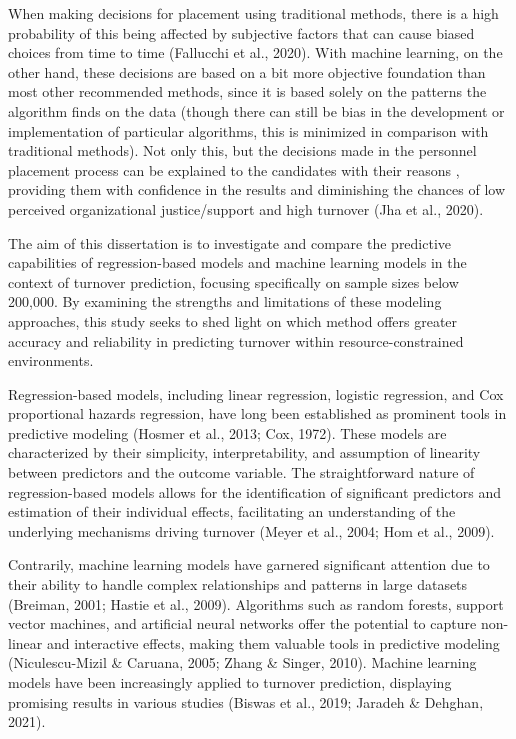 \documentclass[
  man]{apa6}
\begin{document}
When making decisions for placement using traditional methods, there is a high probability of this being affected by subjective factors that can cause biased choices from time to time (Fallucchi et al., 2020). With machine learning, on the other hand, these decisions are based on a bit more objective foundation than most other recommended methods, since it is based solely on the patterns the algorithm finds on the data (though there can still be bias in the development or implementation of particular algorithms, this is minimized in comparison with traditional methods). Not only this, but the decisions made in the personnel placement process can be explained to the candidates with their reasons , providing them with confidence in the results and diminishing the chances of low perceived organizational justice/support and high turnover (Jha et al., 2020).

The aim of this dissertation is to investigate and compare the predictive capabilities of regression-based models and machine learning models in the context of turnover prediction, focusing specifically on sample sizes below 200,000. By examining the strengths and limitations of these modeling approaches, this study seeks to shed light on which method offers greater accuracy and reliability in predicting turnover within resource-constrained environments.

Regression-based models, including linear regression, logistic regression, and Cox proportional hazards regression, have long been established as prominent tools in predictive modeling (Hosmer et al., 2013; Cox, 1972). These models are characterized by their simplicity, interpretability, and assumption of linearity between predictors and the outcome variable. The straightforward nature of regression-based models allows for the identification of significant predictors and estimation of their individual effects, facilitating an understanding of the underlying mechanisms driving turnover (Meyer et al., 2004; Hom et al., 2009).

Contrarily, machine learning models have garnered significant attention due to their ability to handle complex relationships and patterns in large datasets (Breiman, 2001; Hastie et al., 2009). Algorithms such as random forests, support vector machines, and artificial neural networks offer the potential to capture non-linear and interactive effects, making them valuable tools in predictive modeling (Niculescu-Mizil \& Caruana, 2005; Zhang \& Singer, 2010). Machine learning models have been increasingly applied to turnover prediction, displaying promising results in various studies (Biswas et al., 2019; Jaradeh \& Dehghan, 2021).
\end{document}

